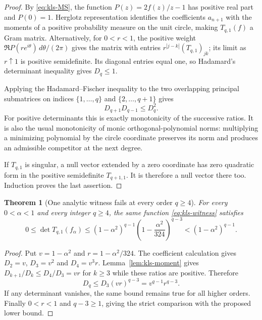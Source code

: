 \documentclass[11pt,a4paper]{article}
\numberwithin{equation}{section}
\newtheorem{theorem}{Theorem}[section]
\theoremstyle{definition}\newtheorem{definition}[theorem]{Definition}
\theoremstyle{remark}\newtheorem{remark}[theorem]{Remark}
\begin{document}
\begin{proof}
By \eqref{eq:kls-MS}, the function $P(z)=2f(z)/z-1$ has positive
real part and $P(0)=1$.  Herglotz representation identifies the
coefficients $a_{n+1}$ with the moments of a positive probability
measure on the unit circle, making $T_{q,1}(f)$ a Gram matrix.
Alternatively, for $0<r<1$, the positive weight
$\Re P(re^{i\theta})\,d\theta/(2\pi)$ gives the matrix with
entries $r^{|j-k|}(T_{q,1})_{jk}$; its limit as $r\uparrow1$ is
positive semidefinite.  Its diagonal entries equal one, so
Hadamard's determinant inequality gives $D_q\leq1$.

Applying the Hadamard--Fischer inequality to the two overlapping
principal submatrices on indices $\{1,\ldots,q\}$ and
$\{2,\ldots,q+1\}$ gives
\[
 D_{q+1}D_{q-1}\leq D_q^2.
\]
For positive determinants this is exactly monotonicity of the
successive ratios.  It is also the usual monotonicity of monic
orthogonal-polynomial norms: multiplying a minimizing polynomial
by the circle coordinate preserves its norm and produces an
admissible competitor at the next degree.

If $T_{q,1}$ is singular, a null vector extended by a zero coordinate
has zero quadratic form in the positive semidefinite $T_{q+1,1}$.
It is therefore a null vector there too.  Induction proves the last
assertion.
\end{proof}

\begin{theorem}[One analytic witness fails at every order $q\geq4$]
\label{thm:kls-allorders}
For every $0<\alpha<1$ and every integer $q\geq4$, the same
function \eqref{eq:kls-witness} satisfies
\begin{equation}
 0\leq\det T_{q,1}(f_\alpha)
 \leq(1-\alpha^2)^{q-1}
     \left(1-\frac{\alpha^2}{324}\right)^{q-3}
 <(1-\alpha^2)^{q-1}.
 \label{eq:kls-allq}
\end{equation}
\end{theorem}

\begin{proof}
Put $v=1-\alpha^2$ and $r=1-\alpha^2/324$.  The coefficient
calculation gives $D_2=v$, $D_3=v^2$ and $D_4=v^3r$.
Lemma~\ref{lem:kls-moment} gives
$D_{k+1}/D_k\leq D_4/D_3=vr$ for $k\geq3$ while these ratios
are positive.  Therefore
\[
 D_q\leq D_3(vr)^{q-3}=v^{q-1}r^{q-3}.
\]
If any determinant vanishes, the same bound remains true for all
higher orders.  Finally $0<r<1$ and $q-3\geq1$, giving the strict
comparison with the proposed lower bound.
\end{proof}
\end{document}
